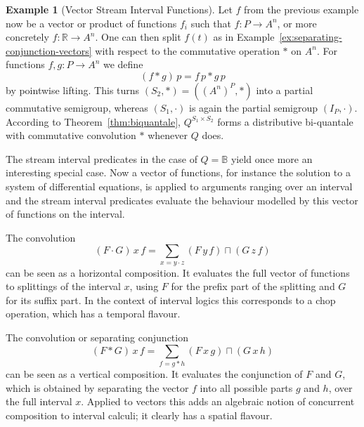 \documentclass[12pt]{article}
\theoremstyle{definition}
\newtheorem{example}{Example}
\begin{document}
\begin{example}[Vector Stream Interval Functions]\label{ex:vector-stream-interval-functions}
  Let $f$ from the previous example now be a vector or product of
  functions $f_i$ such that $f:P\to A^n$, or more concretely
  $f:\mathbb{R}\to A^n$. One can then split $f(t)$ as in
  Example~\ref{ex:separating-conjunction-vectors} with respect to the
  commutative operation $\ast$ on $A^n$. For functions $f,g:P\to A^n$
  we define
  \begin{equation*}
    (f\ast g)\, p = f\, p \ast g\, p
  \end{equation*}
  by pointwise lifting. This turns $(S_2,\ast)=((A^n)^P,\ast)$ into a
  partial commutative semigroup, whereas $(S_1,\cdot)$ is again the
  partial semigroup $(I_P,\cdot)$. According to
  Theorem~\ref{thm:biquantale}, $Q^{S_1\times S_2}$ forms a
  distributive bi-quantale with commutative convolution $\ast$
  whenever $Q$ does.

  The stream interval predicates in the case of $Q=\mathbb{B}$ yield
  once more an interesting special case.  Now a vector of functions,
  for instance the solution to a system of differential equations, is
  applied to arguments ranging over an interval and the stream
  interval predicates evaluate the behaviour modelled by this vector
  of functions on the interval. 

  The convolution
  \begin{equation*}
    (F\cdot
    G)\, x\, f = \sum_{x=y\cdot z}(F\, y\, f)\sqcap (G\, z\, f)
  \end{equation*}
  can be seen as a horizontal composition. It evaluates the full vector
  of functions to splittings of the interval $x$, using $F$ for the
  prefix part of the splitting and $G$ for its suffix part.  In the
  context of interval logics this corresponds to a chop operation,
  which has a temporal flavour.
  
  The convolution or separating conjunction
  \begin{equation*}
    (F\ast G)\, x\, f= \sum_{f=g\ast h} (F\, x\, g)\sqcap (G\, x\, h)
  \end{equation*}
  can be seen as a vertical composition. It evaluates the conjunction
  of $F$ and $G$, which is obtained by separating the vector $f$ into
  all possible parts $g$ and $h$, over the full interval $x$.  Applied
  to vectors this adds an algebraic notion of concurrent composition
  to interval calculi; it clearly has a spatial flavour. 


\end{example}
\end{document}
